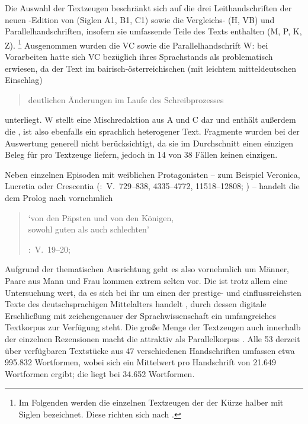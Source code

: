 Die Auswahl der Textzeugen beschränkt sich auf die drei
Leithandschriften der neuen \KC{}-Edition von
\citeauthor{chincaetal2019b} (Siglen A1, B1, C1) sowie die Vergleichs- (H, VB)
und Parallelhandschriften, insofern sie umfassende Teile des
Texts enthalten (M, P, K, Z).%
%
	\footnote{Im Folgenden werden die einzelnen Textzeugen der \KC{} der
	Kürze halber mit Siglen bezeichnet. Diese richten sich nach
	 \autocite{kcdigital}.}
%
Ausgenommen wurden die  VC sowie die
Parallelhandschrift W: bei Vorarbeiten hatte sich VC bezüglich ihres
Sprachstands als problematisch erwiesen, da der Text im
bairisch-österreichischen  (mit leichtem
mitteldeutschen Einschlag)
\blockcquote[73]{wolf:kckat}{deutlichen Änderungen im Laufe des
Schreibprozesses} unterliegt. W stellt eine Mischredaktion aus A und C dar und
enthält außerdem die 
\autocite[48--54]{weis2022}, ist also ebenfalls ein sprachlich heterogener
Text. Fragmente wurden bei der Auswertung generell nicht berücksichtigt, da sie
im Durchschnitt einen einzigen Beleg für  pro Textzeuge liefern,
jedoch in 14 von 38 Fällen keinen einzigen.

Neben einzelnen Episoden mit weiblichen Protagonisten -- zum Beispiel Veronica,
Lucretia oder Crescentia (\KC:~V.~729--838, 4335--4772, 11518--12808;
\cite[vgl.][94--96, 161--169, 292--314]{schroeder1895}) -- handelt die \KC{} dem
Prolog nach vornehmlich

\blockquote[{\KC:~V.~19--20; \cite[79]{schroeder1895}}]{

	`von den Päpsten und von den Königen,\\
	sowohl guten als auch schlechten'
}

Aufgrund der thematischen Ausrichtung geht es also vornehmlich um Männer, Paare
aus Mann und Frau kommen extrem selten vor. Die \KC{} ist trotz allem eine
Untersuchung wert, da es sich bei ihr um einen der prestige- und
einflussreichsten Texte des deutschsprachigen Mittelalters handelt
\autocite[93]{wolf2008}, durch dessen digitale Erschließung mit zeichengenauer
 \autocite{kcdigital} der Sprachwissenschaft ein
umfangreiches Textkorpus zur Verfügung steht. Die große Menge der
Textzeugen auch innerhalb der einzelnen Rezensionen macht die \KC{} attraktiv
als Parallelkorpus \autocite{cysouwwaelchli2007}. Alle 53
derzeit über  verfügbaren Textstücke aus 47 verschiedenen
Handschriften umfassen etwa 995.832 Wortformen, wobei sich ein Mittelwert pro
Handschrift von 21.649 Wortformen ergibt; die  liegt
bei 34.652 Wortformen.

